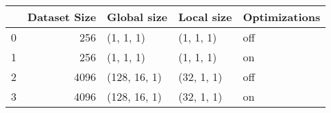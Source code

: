 \begin{tabular}{lrlll}
\toprule
{} &  Dataset Size &   Global size &  Local size & Optimizations \\
\midrule
0 &           256 &     (1, 1, 1) &   (1, 1, 1) &           off \\
1 &           256 &     (1, 1, 1) &   (1, 1, 1) &            on \\
2 &          4096 &  (128, 16, 1) &  (32, 1, 1) &           off \\
3 &          4096 &  (128, 16, 1) &  (32, 1, 1) &            on \\
\bottomrule
\end{tabular}

